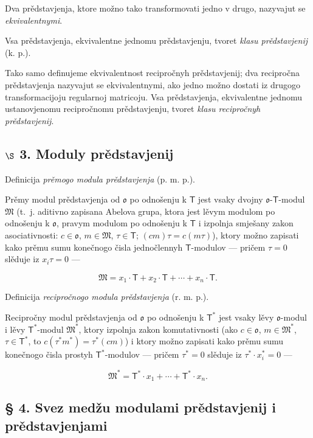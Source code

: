 \documentclass[11pt]{article}
\begin{document}
Dva prědstavjenja, ktore možno tako transformovati jedno v drugo, nazyvajut se \emph{ekvivalentnymi}.

Vsa prědstavjenja, ekvivalentne jednomu prědstavjenju, tvoret \emph{klasu prědstavjenij} (k. p.).

Tako samo definujeme ekvivalentnost recipročnyh prědstavjenij; dva recipročna prědstavjenja nazyvajut se ekvivalentnymi, ako jedno možno dostati iz drugogo transformacijoju regularnoj matricoju. Vsa prědstavjenja, ekvivalentne jednomu ustanovjenomu recipročnomu prědstavjenju, tvoret \emph{klasu recipročnyh prědstavjenij}.

\subsection*{\texorpdfstring{\(\S\) 3. Moduly prědstavjenij}{\textbackslash S 3. Moduly prědstavjenij}}\label{s-3.-darstellungsmoduln}

Definicija \emph{prěmogo modula prědstavjenja} (p. m. p.).

Prěmy modul prědstavjenja od \(\mathfrak{o}\) po odnošenju k \(\mathsf T\) jest vsaky dvojny \(\mathfrak{o}\)-\(\mathsf T\)-modul \(\mathfrak M\) (t.~j. aditivno zapisana Abelova grupa, ktora jest lěvym modulom po odnošenju k \(\mathfrak{o}\), pravym modulom po odnošenju k \(\mathsf T\) i izpolnja smješany zakon asociativnosti: \(c\in\mathfrak{o}\), \(m\in\mathfrak M\), \(\tau\in\mathsf T\); \((cm)\tau=c(m\tau)\)), ktory možno zapisati kako prěmu sumu konečnogo čisla jednočlennyh \(\mathsf T\)-modulov --- pričem \(\tau=0\) slěduje iz \(x_i\tau=0\) ---

\[
\mathfrak M=x_1\cdot\mathsf T+x_2\cdot\mathsf T+\cdots+x_n\cdot\mathsf T.
\]

Definicija \emph{recipročnogo modula prědstavjenja} (r. m. p.).

Recipročny modul prědstavjenja od \(\mathfrak{o}\) po odnošenju k \(\mathsf T^*\) jest vsaky lěvy \(\mathfrak{o}\)-modul i lěvy \(\mathsf T^*\)-modul \(\mathfrak M^*\), ktory izpolnja zakon komutativnosti (ako \(c\in\mathfrak{o}\), \(m\in\mathfrak M^*\), \(\tau\in\mathsf T^*\), to \(c(\tau^*m^*)=\tau^*(cm)\)) i ktory možno zapisati kako prěmu sumu konečnogo čisla prostyh \(\mathsf T^*\)-modulov --- pričem \(\tau^*=0\) slěduje iz \(\tau^*\cdot x_i^*=0\) ---

\[
\mathfrak M^*=\mathsf T^*\cdot x_1+\cdots+\mathsf T^*\cdot x_n.
\]

\subsection*{§ 4. Svez medžu modulami prědstavjenij i prědstavjenjami}\label{der-zusammenhang-zwischen-darstellungsmoduln-und-darstellungen}
\end{document}

